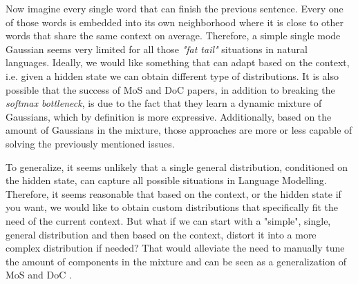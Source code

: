 Now imagine every single word that can finish the previous sentence. Every one of those words is embedded into its own neighborhood where it is close to other words that share the same context on average. Therefore, a simple single mode Gaussian seems very limited for all those \emph{"fat tail"} situations in natural languages. Ideally, we would like something that can adapt based on the context, i.e. given a hidden state we can obtain different type of distributions. It is also possible that the success of MoS \citep{yang2017breaking} and DoC \citep{takase2018direct} papers, in addition to breaking the \emph{softmax bottleneck}, is due to the fact that they learn a dynamic mixture of Gaussians, which by definition is more expressive. Additionally, based on the amount of Gaussians in the mixture, those approaches are more or less capable of solving the previously mentioned issues.

To generalize, it seems unlikely that a single general distribution, conditioned on the hidden state, can capture all possible situations in Language Modelling. Therefore, it seems reasonable that based on the context, or the hidden state if you want, we would like to obtain custom distributions that specifically fit the need of the current context. But what if we can start with a "simple", single, general distribution and then based on the context, distort it into a more complex distribution if needed? That would alleviate the need to manually tune the amount of components in the mixture and can be seen as a generalization of MoS \citep{yang2017breaking} and DoC \citep{takase2018direct}.
